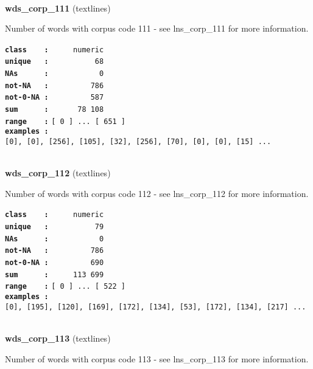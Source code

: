 \documentclass[]{article}
\begin{document}
~

\textbf{wds\_corp\_111} (textlines)

Number of words with corpus code 111 - see lns\_corp\_111 for more
information.

\textbf{\texttt{class\ \ \ \ :}} \texttt{~~~~~numeric}\\
\textbf{\texttt{unique\ \ \ :}} \texttt{~~~~~~~~~~68}\\
\textbf{\texttt{NAs\ \ \ \ \ \ :}} \texttt{~~~~~~~~~~~0}\\
\textbf{\texttt{not-NA\ \ \ :}} \texttt{~~~~~~~~~786}\\
\textbf{\texttt{not-0-NA\ :}} \texttt{~~~~~~~~~587}\\
\textbf{\texttt{sum\ \ \ \ \ \ :}} \texttt{~~~~~~78~108}\\
\textbf{\texttt{range\ \ \ \ :}}
\texttt{{[}\ 0\ {]}\ ...\ {[}\ 651\ {]}}\\
\textbf{\texttt{examples\ :}}
\texttt{{[}0{]},\ {[}0{]},\ {[}256{]},\ {[}105{]},\ {[}32{]},\ {[}256{]},\ {[}70{]},\ {[}0{]},\ {[}0{]},\ {[}15{]}\ ...}\\

~

\textbf{wds\_corp\_112} (textlines)

Number of words with corpus code 112 - see lns\_corp\_112 for more
information.

\textbf{\texttt{class\ \ \ \ :}} \texttt{~~~~~numeric}\\
\textbf{\texttt{unique\ \ \ :}} \texttt{~~~~~~~~~~79}\\
\textbf{\texttt{NAs\ \ \ \ \ \ :}} \texttt{~~~~~~~~~~~0}\\
\textbf{\texttt{not-NA\ \ \ :}} \texttt{~~~~~~~~~786}\\
\textbf{\texttt{not-0-NA\ :}} \texttt{~~~~~~~~~690}\\
\textbf{\texttt{sum\ \ \ \ \ \ :}} \texttt{~~~~~113~699}\\
\textbf{\texttt{range\ \ \ \ :}}
\texttt{{[}\ 0\ {]}\ ...\ {[}\ 522\ {]}}\\
\textbf{\texttt{examples\ :}}
\texttt{{[}0{]},\ {[}195{]},\ {[}120{]},\ {[}169{]},\ {[}172{]},\ {[}134{]},\ {[}53{]},\ {[}172{]},\ {[}134{]},\ {[}217{]}\ ...}\\

~

\textbf{wds\_corp\_113} (textlines)

Number of words with corpus code 113 - see lns\_corp\_113 for more
information.
\end{document}
